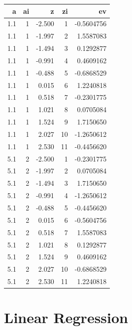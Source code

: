 \documentclass[
]{book}
\begin{document}
\begin{table}[!h]
\centering
\begin{tabular}{r|r|r|r|r}
\hline
a & ai & z & zi & ev\\
\hline
\rowcolor{gray!6}  1.1 & 1 & -2.500 & 1 & -0.5604756\\
\hline
1.1 & 1 & -1.997 & 2 & 1.5587083\\
\hline
\rowcolor{gray!6}  1.1 & 1 & -1.494 & 3 & 0.1292877\\
\hline
1.1 & 1 & -0.991 & 4 & 0.4609162\\
\hline
\rowcolor{gray!6}  1.1 & 1 & -0.488 & 5 & -0.6868529\\
\hline
1.1 & 1 & 0.015 & 6 & 1.2240818\\
\hline
\rowcolor{gray!6}  1.1 & 1 & 0.518 & 7 & -0.2301775\\
\hline
1.1 & 1 & 1.021 & 8 & 0.0705084\\
\hline
\rowcolor{gray!6}  1.1 & 1 & 1.524 & 9 & 1.7150650\\
\hline
1.1 & 1 & 2.027 & 10 & -1.2650612\\
\hline
\rowcolor{gray!6}  1.1 & 1 & 2.530 & 11 & -0.4456620\\
\hline
5.1 & 2 & -2.500 & 1 & -0.2301775\\
\hline
\rowcolor{gray!6}  5.1 & 2 & -1.997 & 2 & 0.0705084\\
\hline
5.1 & 2 & -1.494 & 3 & 1.7150650\\
\hline
\rowcolor{gray!6}  5.1 & 2 & -0.991 & 4 & -1.2650612\\
\hline
5.1 & 2 & -0.488 & 5 & -0.4456620\\
\hline
\rowcolor{gray!6}  5.1 & 2 & 0.015 & 6 & -0.5604756\\
\hline
5.1 & 2 & 0.518 & 7 & 1.5587083\\
\hline
\rowcolor{gray!6}  5.1 & 2 & 1.021 & 8 & 0.1292877\\
\hline
5.1 & 2 & 1.524 & 9 & 0.4609162\\
\hline
\rowcolor{gray!6}  5.1 & 2 & 2.027 & 10 & -0.6868529\\
\hline
5.1 & 2 & 2.530 & 11 & 1.2240818\\
\hline
\end{tabular}
\end{table}

\hypertarget{linear-regression}{%
\chapter{Linear Regression}\label{linear-regression}}
\end{document}
